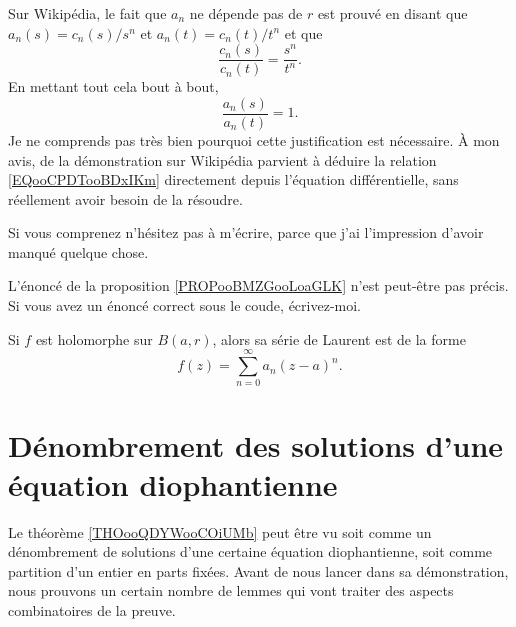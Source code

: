 \begin{probleme}        \label{PROPBooYWDNooMXVPLJ}
    Sur Wikipédia\cite{BIBooUBUAooHyhrlg}, le fait que \( a_n\) ne dépende pas de \( r\) est prouvé en disant que \( a_n(s)=c_n(s)/s^n\) et \( a_n(t)=c_n(t)/t^n\) et que
    \begin{equation}        \label{EQooCPDTooBDxIKm}
        \frac{ c_n(s) }{ c_n(t) }=\frac{ s^n }{ t^n }.
    \end{equation}
    En mettant tout cela bout à bout, 
    \begin{equation}
        \frac{ a_n(s) }{ a_n(t) }=1.
    \end{equation}
    Je ne comprends pas très bien pourquoi cette justification est nécessaire. À mon avis,  de la démonstration sur Wikipédia parvient à déduire la relation \eqref{EQooCPDTooBDxIKm} directement depuis l'équation différentielle, sans réellement avoir besoin de la résoudre.

    Si vous comprenez n'hésitez pas à m'écrire, parce que j'ai l'impression d'avoir manqué quelque chose.
\end{probleme}

\begin{probleme}
    L'énoncé de la proposition \ref{PROPooBMZGooLoaGLK} n'est peut-être pas précis. Si vous avez un énoncé correct sous le coude, écrivez-moi.
\end{probleme}

\begin{proposition}     \label{PROPooBMZGooLoaGLK}
    Si \( f\) est holomorphe sur \( B(a,r)\), alors sa série de Laurent est de la forme
    \begin{equation}
        f(z)=\sum_{n=0}^{\infty}a_n(z-a)^n.
    \end{equation}
\end{proposition}


\section{Dénombrement des solutions d'une équation diophantienne}

Le théorème \ref{THOooQDYWooCOiUMb} peut être vu soit comme un dénombrement de solutions d'une certaine équation diophantienne, soit comme partition d'un entier en parts fixées. Avant de nous lancer dans sa démonstration, nous prouvons un certain nombre de lemmes qui vont traiter des aspects combinatoires de la preuve.

